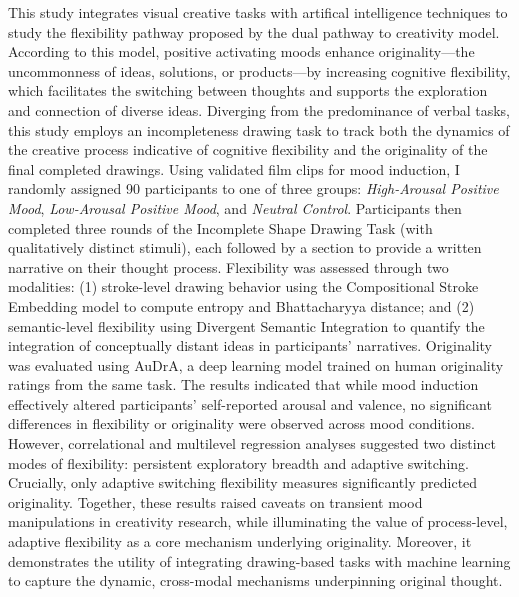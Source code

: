 \documentclass[../MA_Thesis.tex]{subfiles}
\begin{document}
This study integrates visual creative tasks with artifical intelligence techniques to study the flexibility pathway proposed by the dual pathway to creativity model. According to this model, positive activating moods enhance originality—the uncommonness of ideas, solutions, or products—by increasing cognitive flexibility, which facilitates the switching between thoughts and supports the exploration and connection of diverse ideas. Diverging from the predominance of verbal tasks, this study employs an incompleteness drawing task to track both the dynamics of the creative process indicative of cognitive flexibility and the originality of the final completed drawings. Using validated film clips for mood induction, I randomly assigned 90 participants to one of three groups: \textit{High-Arousal Positive Mood}, \textit{Low-Arousal Positive Mood}, and \textit{Neutral Control}. Participants then completed three rounds of the Incomplete Shape Drawing Task (with qualitatively distinct stimuli), each followed by a section to provide a written narrative on their thought process. Flexibility was assessed through two modalities: (1) stroke-level drawing behavior using the Compositional Stroke Embedding model to compute entropy and Bhattacharyya distance; and (2) semantic-level flexibility using Divergent Semantic Integration to quantify the integration of conceptually distant ideas in participants’ narratives. Originality was evaluated using AuDrA, a deep learning model trained on human originality ratings from the same task. The results indicated that while mood induction effectively altered participants’ self-reported arousal and valence, no significant differences in flexibility or originality were observed across mood conditions. However, correlational and multilevel regression analyses suggested two distinct modes of flexibility: persistent exploratory breadth and adaptive switching. Crucially, only adaptive switching flexibility measures significantly predicted originality. Together, these results raised caveats on transient mood manipulations in creativity research, while illuminating the value of process-level, adaptive flexibility as a core mechanism underlying originality. Moreover, it demonstrates the utility of integrating drawing-based tasks with machine learning to capture the dynamic, cross-modal mechanisms underpinning original thought.
\end{document}
